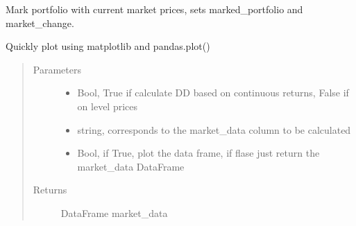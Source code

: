 \documentclass[letterpaper,10pt,english]{sphinxmanual}
\begin{document}
\begin{fulllineitems}
\begin{fulllineitems}
\end{fulllineitems}


\begin{fulllineitems}
\label{\detokenize{securities:risk_dash.securities.Portfolio.mark}}
\sphinxAtStartPar
Mark portfolio with current market prices, sets marked\_portfolio and market\_change.

\end{fulllineitems}


\begin{fulllineitems}
\label{\detokenize{securities:risk_dash.securities.Portfolio.quick_plot}}
\sphinxAtStartPar
Quickly plot using matplotlib and pandas.plot()
\begin{quote}\begin{description}
\item[{Parameters}] \leavevmode\begin{itemize}
\item {} 
\sphinxAtStartPar
{} \textendash{} Bool, True if calculate DD based on continuous returns, False if on level prices

\item {} 
\sphinxAtStartPar
{} \textendash{} string, corresponds to the market\_data column to be calculated

\item {} 
\sphinxAtStartPar
{} \textendash{} Bool, if True, plot the data frame, if flase just return the market\_data DataFrame

\end{itemize}

\item[{Returns}] \leavevmode
\sphinxAtStartPar
DataFrame market\_data


\end{description}
\end{quote}
\end{fulllineitems}
\end{fulllineitems}
\end{document}
